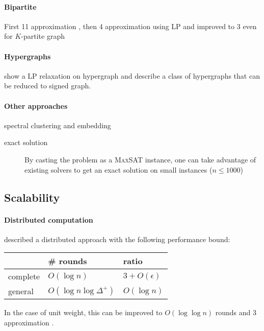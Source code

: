 \paragraph{Bipartite \pcc{}}
First 11 approximation \autocite{Amit04}, then 4 approximation using LP
\autocite{Bipartite12} and improved to 3 even for $K$-partite graph \autocite{Chawla2014}

\paragraph{Hypergraphs} \Textcite{Kim2011} show a LP relaxation on hypergraph
and \textcite{Ricatte13} describe a class of hypergraphs that can be reduced
to signed graph.

\paragraph{Other approaches}

\begin{description}
	\item[spectral clustering and embedding] \autocite{SignedEmbedding15}
	\item[exact solution] By casting the problem as a \textsc{MaxSAT}
		instance, one can take advantage of existing solvers to get an exact
		solution on small instances ($n \leq 1000$) \autocite{Berg2015}
\end{description}

\subsection{Scalability}
\paragraph{Distributed computation}
\Textcite{Chierichetti2014} described a distributed approach with the
following performance bound:

\begin{tabular}{lll}
	\toprule
	& \# rounds  & ratio \\
	\midrule
	complete & $O(\log n)$ & $3 + O(\epsilon)$ \\
	general & $O(\log n\log{\Delta^+})$ & $O(\log{n})$ \\
	\bottomrule
\end{tabular}

In the case of unit weight, this can be improved to $O(\log\log n)$ rounds
and $3$ approximation \autocite{Ahn2015}.

